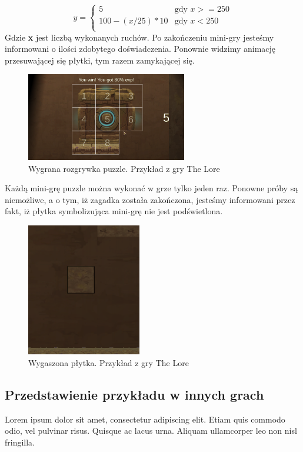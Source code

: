 \documentclass[oneside,polski,logo]{amuthesis}
\begin{document}
$$
y = \left\{ \begin{array}{ll}
5 & \textrm{gdy $x>=250$}\\
100 - (x / 25) * 10 & \textrm{gdy $x<250$}\\
\end{array} \right.
$$
Gdzie \textbf{x} jest liczbą wykonanych ruchów.
Po zakończeniu mini-gry jesteśmy informowani o ilości zdobytego doświadczenia. Ponownie widzimy animację przesuwającej się płytki, tym razem zamykającej się.
\begin{figure}[h]
	\centering
	\includegraphics[width=7cm]{images/tyrek/puzzle_end.png}
	\caption{Wygrana rozgrywka puzzle. Przykład z gry The Lore}
\end{figure}

Każdą mini-grę puzzle można wykonać w grze tylko jeden raz. Ponowne próby są niemożliwe, a o tym, iż zagadka została zakończona, jesteśmy informowani przez fakt, iż płytka symbolizująca mini-grę nie jest podświetlona.

\begin{figure}[h]
	\centering
	\includegraphics[width=5cm]{images/tyrek/puzzleWin.png}
	\caption{Wygaszona płytka. Przykład z gry The Lore}
\end{figure}

\subsection{Przedstawienie przykładu w innych grach}
Lorem ipsum dolor sit amet, consectetur adipiscing elit. Etiam quis commodo odio, vel pulvinar risus. Quisque ac lacus urna. Aliquam ullamcorper leo non nisl fringilla.
\end{document}
